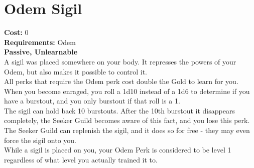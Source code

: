 \section{Odem Sigil}
\textbf{Cost:} 0\\
\textbf{Requirements:} Odem\\
\textbf{Passive, Unlearnable}\\
A sigil was placed somewhere on your body. It represses the powers of your Odem, but also makes it possible to control it.\\
All perks that require the Odem perk cost double the Gold to learn for you.\\
When you become enraged, you roll a 1d10 instead of a 1d6 to determine if you have a burstout, and you only burstout if that roll is a 1.\\
The sigil can hold back 10 burstouts. After the 10th burstout it disappears completely, the Seeker Guild becomes aware of this fact, and you lose this perk. The Seeker Guild can replenish the sigil, and it does so for free - they may even force the sigil onto you.\\
While a sigil is placed on you, your Odem Perk is considered to be level 1 regardless of what level you actually trained it to.\\